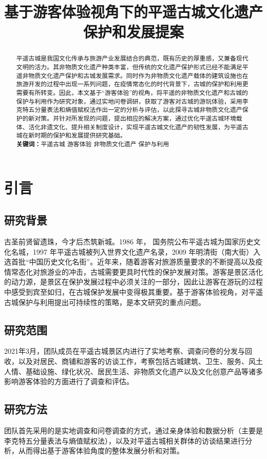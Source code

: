 \documentclass[UTF8]{ctexart}
\title{基于游客体验视角下的平遥古城文化遗产保护和发展提案}
\author{}
\date{}
\begin{document}
\maketitle
\tableofcontents
\newpage
\begin{abstract}
    平遥古城是我国文化传承与旅游产业发展结合的典范，既有历史的厚重感，又兼备现代文明的活力。其非物质文化遗产种类丰富，但传统的文化遗产保护形式已经不能满足平遥非物质文化遗产保护和古城发展需求。同时作为非物质文化遗产载体的建筑设施也在旅游开发的过程中出现一系列问题，在疫情常态化的时代背景下，古城的保护和利用更需要有所转变。因此，本文基于“游客体验”的视角，将平遥的非物质文化遗产和古城的保护与利用作为研究对象，通过实地问卷调研，获取了游客对古城的游玩体验，采用李克特五分量表法和熵值赋权法作出一定的分析与评估，以此探寻古城非物质文化遗产保护的新对策。并针对所发现的问题，提出相应的解决方案，通过优化平遥古城环境载体、活化非遗文化、提升相关制度设计，实现平遥古城文化遗产的韧性发展，为平遥古城在新时期的保护和发展提供研究基础。\\
    \textbf{关键词：}平遥古城 \quad 游客体验 \quad 非物质文化遗产  \quad 保护与利用
\end{abstract}
\section{引言}
    \subsection{研究背景}
    古圣前贤留遗珠，今才后杰筑新城。1986 年， 国务院公布平遥古城为国家历史文化名城，1997 年平遥古城被列入世界文化遗产名录，2009 年明清街（南大街）入选首批“中国历史文化名街”。近年来，随着游客对旅游质量要求的不断提高以及疫情常态化对旅游业的冲击，古城需要更具时代性的保护发展对策。游客是景区活化的动力源，是景区在保护发展过程中必须关注的一部分，因此让游客在游玩的过程中感受到宾至如归，在古城保护发展中变得极其重要。基于游客体验视角，对平遥古城保护与利用提出可持续性的策略，是本文研究的重点问题。
    \subsection{研究范围}
    2021年3月，团队成员在平遥古城景区内进行了实地考察、调查问卷的分发与回收，以及对居民、商铺和游客的访谈工作，考察包括古城建筑、卫生、服务、风土人情、基础设施、绿化状况、居民生活、非物质文化遗产以及文化创意产品等诸多影响游客体验的方面进行了调查和评估。
    \subsection{研究方法}
    团队首先采用的是实地调查和问卷调查的方式，通过亲身体验和数据分析（主要是李克特五分量表法与熵值赋权法），以及对平遥古城相关群体的访谈结果进行分析，从而得出基于游客体验角度的整体发展分析和对策。
\end{document}
